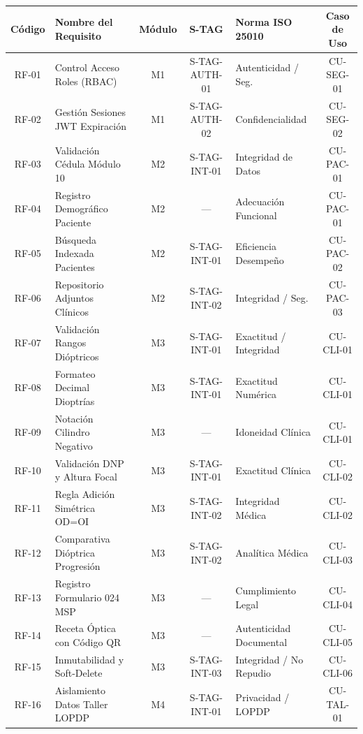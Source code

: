 \documentclass[12pt,a4paper]{report}
\begin{document}
\begin{longtable}{|c|L{4.2cm}|c|c|L{3.2cm}|c|}
\hline
{}\color{white}\textbf{Código} & \color{white}\textbf{Nombre del Requisito} & \color{white}\textbf{Módulo} & \color{white}\textbf{S-TAG} & \color{white}\textbf{Norma ISO 25010} & \color{white}\textbf{Caso de Uso} \\
\hline
\endhead
RF-01 & Control Acceso Roles (RBAC) & M1 & S-TAG-AUTH-01 & Autenticidad / Seg. & CU-SEG-01 \\
\hline
RF-02 & Gestión Sesiones JWT Expiración & M1 & S-TAG-AUTH-02 & Confidencialidad & CU-SEG-02 \\
\hline
RF-03 & Validación Cédula Módulo 10 & M2 & S-TAG-INT-01 & Integridad de Datos & CU-PAC-01 \\
\hline
RF-04 & Registro Demográfico Paciente & M2 & --- & Adecuación Funcional & CU-PAC-01 \\
\hline
RF-05 & Búsqueda Indexada Pacientes & M2 & S-TAG-INT-01 & Eficiencia Desempeño & CU-PAC-02 \\
\hline
RF-06 & Repositorio Adjuntos Clínicos & M2 & S-TAG-INT-02 & Integridad / Seg. & CU-PAC-03 \\
\hline
RF-07 & Validación Rangos Dióptricos & M3 & S-TAG-INT-01 & Exactitud / Integridad & CU-CLI-01 \\
\hline
RF-08 & Formateo Decimal Dioptrías & M3 & S-TAG-INT-01 & Exactitud Numérica & CU-CLI-01 \\
\hline
RF-09 & Notación Cilindro Negativo & M3 & --- & Idoneidad Clínica & CU-CLI-01 \\
\hline
RF-10 & Validación DNP y Altura Focal & M3 & S-TAG-INT-01 & Exactitud Clínica & CU-CLI-02 \\
\hline
RF-11 & Regla Adición Simétrica OD=OI & M3 & S-TAG-INT-02 & Integridad Médica & CU-CLI-02 \\
\hline
RF-12 & Comparativa Dióptrica Progresión& M3 & S-TAG-INT-02 & Analítica Médica & CU-CLI-03 \\
\hline
RF-13 & Registro Formulario 024 MSP & M3 & --- & Cumplimiento Legal & CU-CLI-04 \\
\hline
RF-14 & Receta Óptica con Código QR & M3 & --- & Autenticidad Documental & CU-CLI-05 \\
\hline
RF-15 & Inmutabilidad y Soft-Delete & M3 & S-TAG-INT-03 & Integridad / No Repudio & CU-CLI-06 \\
\hline
RF-16 & Aislamiento Datos Taller LOPDP & M4 & S-TAG-INT-01 & Privacidad / LOPDP & CU-TAL-01 \\

\end{longtable}
\end{document}
